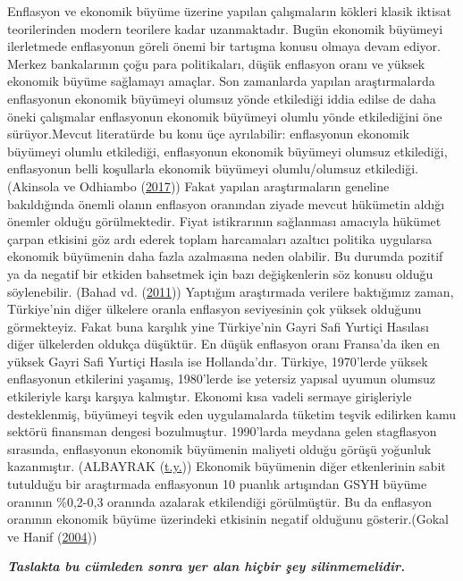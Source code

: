 \documentclass[
  12pt,
]{article}
\begin{document}
Enflasyon ve ekonomik büyüme üzerine yapılan çalışmaların kökleri klasik iktisat teorilerinden modern teorilere kadar uzanmaktadır. Bugün ekonomik büyümeyi ilerletmede enflasyonun göreli önemi bir tartışma konusu olmaya devam ediyor. Merkez bankalarının çoğu para politikaları, düşük enflasyon oranı ve yüksek ekonomik büyüme sağlamayı amaçlar.
Son zamanlarda yapılan araştırmalarda enflasyonun ekonomik büyümeyi olumsuz yönde etkilediği iddia edilse de daha öneki çalışmalar enflasyonun ekonomik büyümeyi olumlu yönde etkilediğini öne sürüyor.Mevcut literatürde bu konu üçe ayrılabilir: enflasyonun ekonomik büyümeyi olumlu etkilediği, enflasyonun ekonomik büyümeyi olumsuz etkilediği, enflasyonun belli koşullarla ekonomik büyümeyi olumlu/olumsuz etkilediği. (Akinsola ve Odhiambo (\protect\hyperlink{ref-akinsola2017inflation}{2017}))
Fakat yapılan araştırmaların geneline bakıldığında önemli olanın enflasyon oranından ziyade mevcut hükümetin aldığı önemler olduğu görülmektedir. Fiyat istikrarının sağlanması amacıyla hükümet çarpan etkisini göz ardı ederek toplam harcamaları azaltıcı politika uygularsa ekonomik büyümenin daha fazla azalmasına neden olabilir. Bu durumda pozitif ya da negatif bir etkiden bahsetmek için bazı değişkenlerin söz konusu olduğu söylenebilir. (Bahad vd. (\protect\hyperlink{ref-bahad2011enflasyon}{2011}))
Yaptığım araştırmada verilere baktığımız zaman, Türkiye'nin diğer ülkelere oranla enflasyon seviyesinin çok yüksek olduğunu görmekteyiz. Fakat buna karşılık yine Türkiye'nin Gayri Safi Yurtiçi Hasılası diğer ülkelerden oldukça düşüktür. En düşük enflasyon oranı Fransa'da iken en yüksek Gayri Safi Yurtiçi Hasıla ise Hollanda'dır.
Türkiye, 1970'lerde yüksek enflasyonun etkilerini yaşamış, 1980'lerde ise yetersiz yapısal uyumun olumsuz etkileriyle karşı karşıya kalmıştır. Ekonomi kısa vadeli sermaye girişleriyle desteklenmiş, büyümeyi teşvik eden uygulamalarda tüketim teşvik edilirken kamu sektörü finansman dengesi bozulmuştur. 1990'larda meydana gelen stagflasyon sırasında, enflasyonun ekonomik büyümenin maliyeti olduğu görüşü yoğunluk kazanmıştır. (ALBAYRAK (\protect\hyperlink{ref-albayrak9ekonomik}{t.y.}))
Ekonomik büyümenin diğer etkenlerinin sabit tutulduğu bir araştırmada enflasyonun 10 puanlık artışından GSYH büyüme oranının \%0,2-0,3 oranında azalarak etkilendiği görülmüştür. Bu da enflasyon oranının ekonomik büyüme üzerindeki etkisinin negatif olduğunu gösterir.(Gokal ve Hanif (\protect\hyperlink{ref-gokal2004relationship}{2004}))

\textbf{\emph{Taslakta bu cümleden sonra yer alan hiçbir şey silinmemelidir.}}
\end{document}
